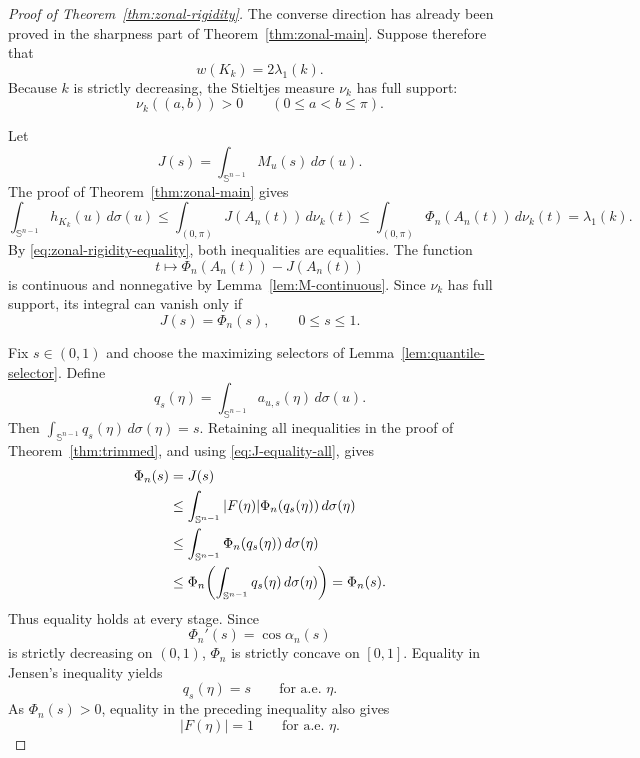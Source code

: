 \documentclass[10pt,a4paper]{amsart}
\begin{document}
\begin{proof}[Proof of Theorem~\ref{thm:zonal-rigidity}]
The converse direction has already been proved in the sharpness part of
Theorem~\ref{thm:zonal-main}.  Suppose therefore that
\begin{equation}\label{eq:zonal-rigidity-equality}
 w(K_k)=2\lambda_1(k).
\end{equation}
Because $k$ is strictly decreasing, the Stieltjes measure $\nu_k$ has full
support:
\[
 \nu_k((a,b))>0
 \qquad
 (0\le a<b\le\pi).
\]

Let
\[
 J(s)=\int_{\mathbb S^{n-1}} M_u(s)\,d\sigma(u).
\]
The proof of Theorem~\ref{thm:zonal-main} gives
\[
 \int_{\mathbb S^{n-1}} h_{K_k}(u)\,d\sigma(u)
 \le
 \int_{(0,\pi)}J(A_n(t))\,d\nu_k(t)
 \le
 \int_{(0,\pi)}\Phi_n(A_n(t))\,d\nu_k(t)
 =
 \lambda_1(k).
\]
By \eqref{eq:zonal-rigidity-equality}, both inequalities are equalities.
The function
\[
 t\longmapsto
 \Phi_n(A_n(t))-J(A_n(t))
\]
is continuous and nonnegative by Lemma~\ref{lem:M-continuous}.  Since
$\nu_k$ has full support, its integral can vanish only if
\begin{equation}\label{eq:J-equality-all}
 J(s)=\Phi_n(s),
 \qquad 0\le s\le1.
\end{equation}

Fix $s\in(0,1)$ and choose the maximizing selectors of
Lemma~\ref{lem:quantile-selector}.  Define
\[
 q_s(\eta)
 =
 \int_{\mathbb S^{n-1}}a_{u,s}(\eta)\,d\sigma(u).
\]
Then $\int_{\mathbb S^{n-1}} q_s(\eta)\,d\sigma(\eta)=s$.  Retaining all inequalities in the proof of
Theorem~\ref{thm:trimmed}, and using \eqref{eq:J-equality-all}, gives
\begin{align}
 \Phi_n(s)
 &=
 J(s)\notag\\
 &\le
 \int_{\mathbb S^{n-1}} |F(\eta)|\Phi_n(q_s(\eta))\,d\sigma(\eta)\notag\\
 &\le
 \int_{\mathbb S^{n-1}} \Phi_n(q_s(\eta))\,d\sigma(\eta)\notag\\
 &\le
 \Phi_n\!\left(\int_{\mathbb S^{n-1}} q_s(\eta)\,d\sigma(\eta)\right)
 =
 \Phi_n(s).
\label{eq:zonal-rigidity-chain}
\end{align}
Thus equality holds at every stage.  Since
\[
 \Phi_n'(s)=\cos\alpha_n(s)
\]
is strictly decreasing on $(0,1)$, $\Phi_n$ is strictly concave on $[0,1]$.
Equality in Jensen's inequality yields
\begin{equation}\label{eq:zonal-q}
 q_s(\eta)=s
 \qquad\text{for a.e. }\eta.
\end{equation}
As $\Phi_n(s)>0$, equality in the preceding inequality also gives
\begin{equation}\label{eq:zonal-F-sphere}
 |F(\eta)|=1
 \qquad\text{for a.e. }\eta.
\end{equation}


\end{proof}
\end{document}
